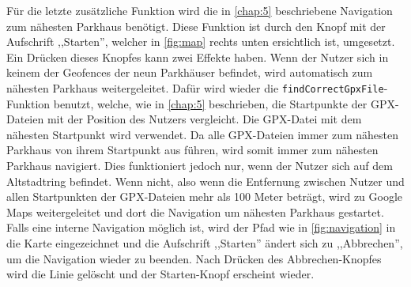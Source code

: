 Für die letzte zusätzliche Funktion wird die in \autoref{chap:5} beschriebene Navigation zum nähesten Parkhaus benötigt. Diese Funktion ist durch den Knopf mit der Aufschrift ,,Starten'', welcher in \autoref{fig:map} rechts unten ersichtlich ist, umgesetzt. Ein Drücken dieses Knopfes kann zwei Effekte haben. Wenn der Nutzer sich in keinem der Geofences der neun Parkhäuser befindet, wird automatisch zum nähesten Parkhaus weitergeleitet. Dafür wird wieder die \verb|findCorrectGpxFile|-Funktion benutzt, welche, wie in \autoref{chap:5} beschrieben, die Startpunkte der GPX-Dateien mit der Position des Nutzers vergleicht. Die GPX-Datei mit dem nähesten Startpunkt wird verwendet. Da alle GPX-Dateien immer zum nähesten Parkhaus von ihrem Startpunkt aus führen, wird somit immer zum nähesten Parkhaus navigiert. Dies funktioniert jedoch nur, wenn der Nutzer sich auf dem Altstadtring befindet. Wenn nicht, also wenn die Entfernung zwischen Nutzer und allen Startpunkten der GPX-Dateien mehr als 100 Meter beträgt, wird zu Google Maps weitergeleitet und dort die Navigation um nähesten Parkhaus gestartet. Falls eine interne Navigation möglich ist, wird der Pfad wie in \autoref{fig:navigation} in die Karte eingezeichnet und die Aufschrift ,,Starten'' ändert sich zu ,,Abbrechen'', um die Navigation wieder zu beenden. Nach Drücken des Abbrechen-Knopfes wird die Linie gelöscht und der Starten-Knopf erscheint wieder.

